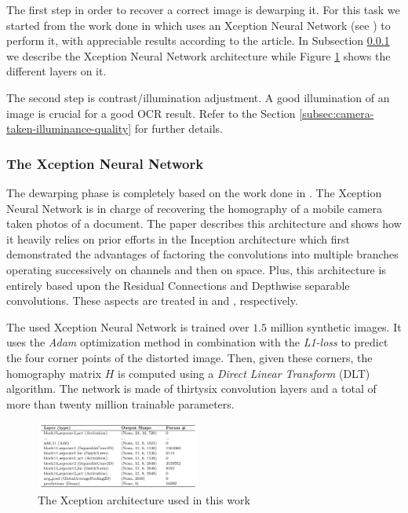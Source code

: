 \documentclass[10pt,twocolumn,letterpaper]{article}
\begin{document}
The first step in order to recover a correct image is dewarping
it. For this task we started from the work done in \cite{Korber18}
which uses an Xception Neural Network (see \cite{Xception}) to perform
it, with appreciable results according to the article. In Subsection
\ref{subsec:xception-nn-architecture} we describe the Xception Neural
Network architecture while Figure \ref{fig:xception-architecture}
shows the different layers on it.

The second step is contrast/illumination adjustment. A good
illumination of an image is crucial for a good OCR result. Refer to
the Section \ref{subsec:camera-taken-illuminance-quality} for further
details.

\subsubsection{The Xception Neural Network}
\label{subsec:xception-nn-architecture}

The dewarping phase is completely based on the work done in
\cite{Korber18}. The Xception Neural Network is in charge of
recovering the homography of a mobile camera taken photos of a
document. The paper \cite{Xception} describes this architecture and
shows how it heavily relies on prior efforts in the Inception
architecture which first demonstrated the advantages of factoring the
convolutions into multiple branches operating successively on channels
and then on space. Plus, this architecture is entirely based upon the
Residual Connections and Depthwise separable convolutions. These
aspects are treated in \cite{Sahoo17} and \cite{Wang18}, respectively.

The used Xception Neural Network is trained over $1.5$ million
synthetic images. It uses the \emph{Adam} optimization method in
combination with the \emph{L1-loss} to predict the four corner points
of the distorted image. Then, given these corners, the homography
matrix $H$ is computed using a \emph{Direct Linear Transform} (DLT)
algorithm. The network is made of thirtysix convolution layers and a
total of more than twenty million trainable parameters.

\begin{figure}[!ht]
  \centering
  \includegraphics[width=0.48\textwidth]{images/xception-architecture.png}
  \caption{The Xception architecture used in this work}
  \label{fig:xception-architecture}
\end{figure}
\end{document}
